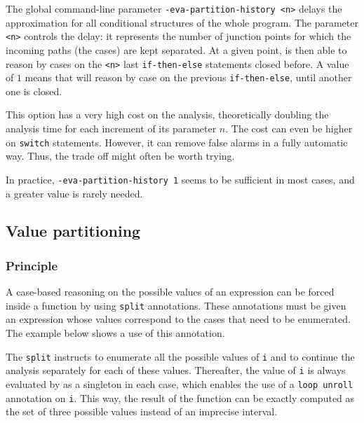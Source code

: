 \documentclass{frama-c-book}
\begin{document}
The global command-line parameter \lstinline|-eva-partition-history <n>|
delays the approximation for all conditional structures of the whole
program. The parameter \lstinline|<n>| controls the delay:
it represents the number of junction points for which the incoming
paths (the cases) are kept separated. At a given point, \Eva{} is then able to
reason by cases on the \lstinline|<n>| last \lstinline|if-then-else| statements
closed before.
A value of $1$ means that \Eva{} will reason by
case on the previous \lstinline|if-then-else|, until another one is closed.

This option has a very high cost on the analysis, theoretically doubling the
analysis time for each increment of its parameter $n$.
The cost can even be higher on \lstinline|switch| statements.
However, it can remove false alarms in a fully automatic way. Thus,
the trade off might often be worth trying.

In practice, \lstinline|-eva-partition-history 1| seems to be sufficient in
most cases, and a greater value is rarely needed.


\subsection{Value partitioning}
\label{value-partitioning}

\subsubsection{Principle}

A case-based reasoning on the possible values of an expression can be forced
inside a function by using \lstinline|split| annotations.  These annotations
must be given an expression whose values correspond to the cases that need to be
enumerated. The example below shows a use of this annotation.


The \lstinline|split| instructs \Eva{} to enumerate all the possible
values of \lstinline|i| and to continue the analysis separately for
each of these values. Thereafter, the value of \lstinline|i| is always
evaluated by \Eva{} as a singleton in each case, which enables the use of a
\lstinline|loop unroll| annotation on \lstinline|i|. This way, the result of
the function can be exactly computed as the set of three possible values instead
of an imprecise interval.

\end{document}
